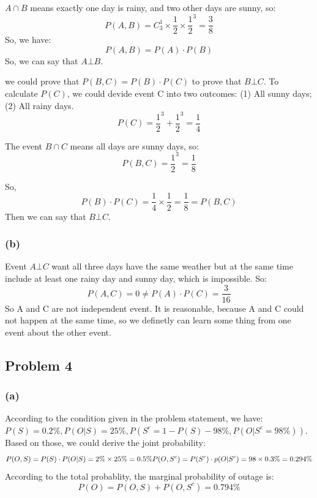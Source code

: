 \documentclass[a4paper]{article}
\begin{document}
$A \cap B$ means exactly one day is rainy, and two other days are sunny, so:
\begin{equation}
	P(A,B)=C_{3}^{1} \times \frac{1}{2} \times \frac{1}{2}^{3}=\frac{3}{8}
\end{equation}
So, we have:
\begin{equation}
	P(A,B)=P(A)\cdot P(B)
\end{equation}
So, we can say that $A \bot B$.

we could prove that $P(B,C)=P(B)\cdot P(C)$ to prove that $B \bot C$.
To calculate $P(C)$, we could devide event C into two outcomes: (1) All sunny days; (2) All rainy days.
\begin{equation}
	P(C)=\frac{1}{2}^{3}+\frac{1}{2}^{3}=\frac{1}{4}
\end{equation}

The event $B \cap C$ means all days are sunny days, so:
\begin{equation}
	P(B,C)=\frac{1}{2}^{3}=\frac{1}{8}
\end{equation}

So, 
\begin{equation}
	P(B)\cdot P(C)=\frac{1}{4} \times \frac{1}{2}=\frac{1}{8}=P(B,C)
\end{equation}
Then we can say that $B \bot C$.
\subsubsection{(b)}
Event $A \bot C$ want all three days have the same weather but at the same time include at least one rainy day and sunny day, which is impossible. So:
\begin{equation}
	P(A,C)=0 \neq P(A)\cdot P(C)=\frac{3}{16}
\end{equation}
So A and C are not independent event. It is reasonable, because A and C could not happen at the same time, so we definetly can learn some thing from one event about the other event.

\subsection{Problem 4}
\subsubsection{(a)}
According to the condition given in the problem statement, we have: $P(S)=0.2 \%, P(O|S)=25 \%, P(S^{c}=1-P(S)-98 \%, P(O|S^{c}=98 \%))$. Based on those, we could derive the joint probability:
\begin{equation}
	P(O,S)=P(S)\cdot P(O|S)=2 \% \times 25 \% =0.5 \%\\
	P(O,S^{c})=P(S^{c}) \cdot p(O|S^{c})=98 \times 0.3 \%=0.294\%
\end{equation}
According to the total probablity, the marginal probability of outage is:
\begin{equation}
	P(O)=P(O,S)+P(O,S^{c})=0.794\%
\end{equation}
\end{document}
